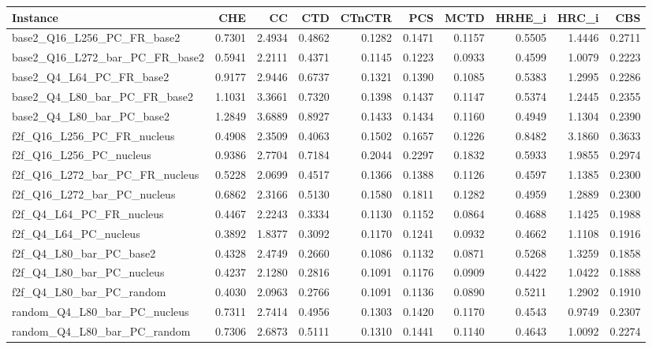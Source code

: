 \begin{tabular}{lrrrrrrrrr}
\toprule
Instance & CHE & CC & CTD & CTnCTR & PCS & MCTD & HRHE_i & HRC_i & CBS \\
\midrule
base2_Q16_L256_PC_FR_base2 & 0.7301 & 2.4934 & 0.4862 & 0.1282 & 0.1471 & 0.1157 & 0.5505 & 1.4446 & 0.2711 \\
base2_Q16_L272_bar_PC_FR_base2 & 0.5941 & 2.2111 & 0.4371 & 0.1145 & 0.1223 & 0.0933 & 0.4599 & 1.0079 & 0.2223 \\
base2_Q4_L64_PC_FR_base2 & 0.9177 & 2.9446 & 0.6737 & 0.1321 & 0.1390 & 0.1085 & 0.5383 & 1.2995 & 0.2286 \\
base2_Q4_L80_bar_PC_FR_base2 & 1.1031 & 3.3661 & 0.7320 & 0.1398 & 0.1437 & 0.1147 & 0.5374 & 1.2445 & 0.2355 \\
base2_Q4_L80_bar_PC_base2 & 1.2849 & 3.6889 & 0.8927 & 0.1433 & 0.1434 & 0.1160 & 0.4949 & 1.1304 & 0.2390 \\
f2f_Q16_L256_PC_FR_nucleus & 0.4908 & 2.3509 & 0.4063 & 0.1502 & 0.1657 & 0.1226 & 0.8482 & 3.1860 & 0.3633 \\
f2f_Q16_L256_PC_nucleus & 0.9386 & 2.7704 & 0.7184 & 0.2044 & 0.2297 & 0.1832 & 0.5933 & 1.9855 & 0.2974 \\
f2f_Q16_L272_bar_PC_FR_nucleus & 0.5228 & 2.0699 & 0.4517 & 0.1366 & 0.1388 & 0.1126 & 0.4597 & 1.1385 & 0.2300 \\
f2f_Q16_L272_bar_PC_nucleus & 0.6862 & 2.3166 & 0.5130 & 0.1580 & 0.1811 & 0.1282 & 0.4959 & 1.2889 & 0.2300 \\
f2f_Q4_L64_PC_FR_nucleus & 0.4467 & 2.2243 & 0.3334 & 0.1130 & 0.1152 & 0.0864 & 0.4688 & 1.1425 & 0.1988 \\
f2f_Q4_L64_PC_nucleus & 0.3892 & 1.8377 & 0.3092 & 0.1170 & 0.1241 & 0.0932 & 0.4662 & 1.1108 & 0.1916 \\
f2f_Q4_L80_bar_PC_base2 & 0.4328 & 2.4749 & 0.2660 & 0.1086 & 0.1132 & 0.0871 & 0.5268 & 1.3259 & 0.1858 \\
f2f_Q4_L80_bar_PC_nucleus & 0.4237 & 2.1280 & 0.2816 & 0.1091 & 0.1176 & 0.0909 & 0.4422 & 1.0422 & 0.1888 \\
f2f_Q4_L80_bar_PC_random & 0.4030 & 2.0963 & 0.2766 & 0.1091 & 0.1136 & 0.0890 & 0.5211 & 1.2902 & 0.1910 \\
random_Q4_L80_bar_PC_nucleus & 0.7311 & 2.7414 & 0.4956 & 0.1303 & 0.1420 & 0.1170 & 0.4543 & 0.9749 & 0.2307 \\
random_Q4_L80_bar_PC_random & 0.7306 & 2.6873 & 0.5111 & 0.1310 & 0.1441 & 0.1140 & 0.4643 & 1.0092 & 0.2274 \\
\bottomrule
\end{tabular}
